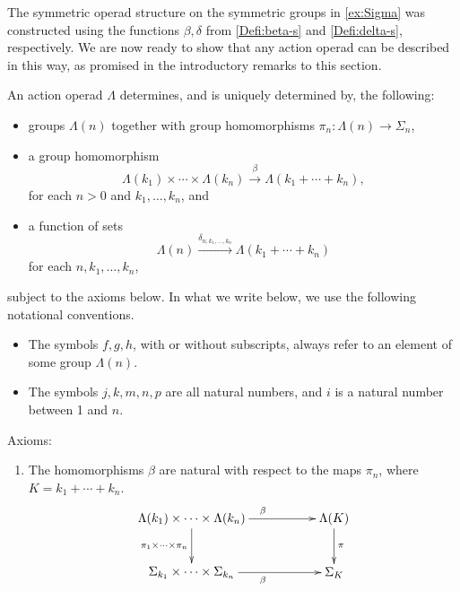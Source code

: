 The symmetric operad structure on the symmetric groups in \cref{ex:Sigma} was constructed using the functions $\beta, \delta$ from \cref{Defi:beta-s} and \cref{Defi:delta-s}, respectively.
We are now ready to show that any action operad can be described in this way, as promised in the introductory remarks to this section.

\begin{thm}\label{thm:charAOp}
An action operad $\Lambda$ determines, and is uniquely determined by, the following: 
\begin{itemize}
\item groups $\Lambda(n)$ together with group homomorphisms $\pi_{n} \colon \Lambda(n) \rightarrow \Sigma_{n}$,
\item a group homomorphism
  \[
    \Lambda(k_{1}) \times \cdots \times \Lambda(k_{n}) \stackrel{\beta}{\longrightarrow} \Lambda(k_{1} + \cdots + k_{n}),
  \]
for each $n > 0$ and $k_{1}, \ldots, k_{n}$, and
\item a function of sets
  \[
    \Lambda(n) \stackrel{\delta_{n; k_{1}, \ldots, k_{n}}}{\longrightarrow} \Lambda(k_{1} + \cdots + k_{n})
  \]
for each $n, k_{1}, \ldots, k_{n}$,
\end{itemize}
subject to the axioms below. In what we write below, we use the following notational conventions.
\begin{itemize}
\item The symbols $f,g,h$, with or without subscripts, always refer to an element of some group $\Lambda(n)$.
\item The symbols $j,k,m,n,p$ are all natural numbers, and $i$ is a natural number between 1 and $n$.
\end{itemize}
Axioms:
\begin{enumerate}
\item\label{eq1} The homomorphisms $\beta$ are natural with respect to the maps $\pi_{n}$, where $K = k_{1} + \cdots + k_{n}$.
  \[
    \xy
      (0,0)*+{\Lambda(k_{1}) \times \cdots \times \Lambda(k_{n}) } ="00";
      (0,-15)*+{\Sigma_{k_{1}} \times \cdots \times \Sigma_{k_{n}}  } ="01";
      (40,0)*+{\Lambda(K) } ="20";
      (40,-15)*+{\Sigma_{K} } ="21";
      {\ar^{\beta} "00" ; "20"};
      {\ar^{\pi} "20" ; "21"};
      {\ar_{\pi_1 \times \cdots \times \pi_n} "00" ; "01"};
      {\ar_{\beta} "01" ; "21"};
    \endxy
  \]


\end{enumerate}
\end{thm}
